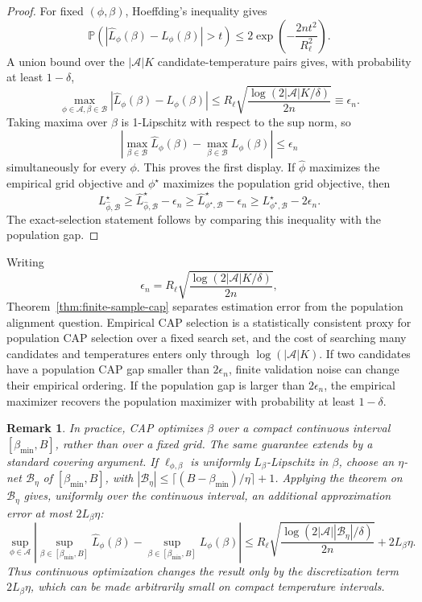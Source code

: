 \documentclass[11pt]{article}
\newtheorem{remark}{Remark}
\newcommand{\Pbb}{\mathbb{P}}
\begin{document}
\begin{proof}
For fixed \((\phi,\beta)\), Hoeffding's inequality gives
\[
    \Pbb\!\left(
        |\widehat L_\phi(\beta)-L_\phi(\beta)|>t
    \right)
    \le
    2\exp\!\left(-\frac{2nt^2}{R_\ell^2}\right).
\]
A union bound over the \(|\mathcal A|K\) candidate-temperature pairs gives,
with probability at least \(1-\delta\),
\[
    \max_{\phi\in\mathcal A,\beta\in\mathcal B}
    |\widehat L_\phi(\beta)-L_\phi(\beta)|
    \le
    R_\ell
    \sqrt{
        \frac{\log(2|\mathcal A|K/\delta)}{2n}
    }
    \equiv \epsilon_n .
\]
Taking maxima over \(\beta\) is 1-Lipschitz with respect to the sup norm, so
\[
    \left|
        \max_{\beta\in\mathcal B}\widehat L_\phi(\beta)
        -
        \max_{\beta\in\mathcal B}L_\phi(\beta)
    \right|
    \le \epsilon_n
\]
simultaneously for every \(\phi\). This proves the first display. If
\(\widehat\phi\) maximizes the empirical grid objective and
\(\phi^\star\) maximizes the population grid objective, then
\[
    L_{\widehat\phi,\mathcal B}^{\star}
    \ge
    \widehat L_{\widehat\phi,\mathcal B}^{\star}-\epsilon_n
    \ge
    \widehat L_{\phi^\star,\mathcal B}^{\star}-\epsilon_n
    \ge
    L_{\phi^\star,\mathcal B}^{\star}-2\epsilon_n .
\]
The exact-selection statement follows by comparing this inequality with the
population gap.
\end{proof}

Writing
\[
    \epsilon_n
    =
    R_\ell
    \sqrt{
        \frac{\log(2|\mathcal A|K/\delta)}{2n}
    },
\]
Theorem~\ref{thm:finite-sample-cap} separates estimation error from the
population alignment question. Empirical CAP selection is a statistically
consistent proxy for population CAP selection over a fixed search set, and the cost of searching many candidates and
temperatures enters only through \(\log(|\mathcal A|K)\). If two candidates have
a population CAP gap smaller than \(2\epsilon_n\), finite validation noise can
change their empirical ordering. If the population gap is larger than
\(2\epsilon_n\), the empirical maximizer recovers the population maximizer with
probability at least \(1-\delta\).

\begin{remark}
In practice, CAP optimizes \(\beta\) over a compact
continuous interval \([\beta_{\min},B]\), rather than over a fixed grid. The
same guarantee extends by a standard covering argument. If
\(\ell_{\phi,\beta}\) is uniformly \(L_\beta\)-Lipschitz in \(\beta\), choose
an \(\eta\)-net \(\mathcal B_\eta\) of \([\beta_{\min},B]\), with
\(|\mathcal B_\eta|\le \lceil(B-\beta_{\min})/\eta\rceil+1\). Applying the
theorem on \(\mathcal B_\eta\) gives, uniformly over the continuous interval,
an additional approximation error at most \(2L_\beta\eta\):
\[
    \sup_{\phi\in\mathcal A}
    \left|
        \sup_{\beta\in[\beta_{\min},B]}\widehat L_\phi(\beta)
        -
        \sup_{\beta\in[\beta_{\min},B]}L_\phi(\beta)
    \right|
    \le
    R_\ell
    \sqrt{
        \frac{\log(2|\mathcal A||\mathcal B_\eta|/\delta)}{2n}
    }
    +
    2L_\beta\eta .
\]
Thus continuous optimization changes the result only by the discretization
term \(2L_\beta\eta\), which can be made arbitrarily small on compact
temperature intervals.
\end{remark}
\end{document}
